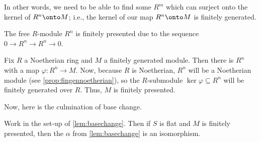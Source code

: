 In other words, we need to be able to find some $R^m$ which can surject onto the kernel of $R^n\onto M$; i.e., the kernel of our map $R^n\onto M$ is finitely generated.
\begin{example}
	The free $R$-module $R^n$ is finitely presented due to the sequence $0\to R^n\to R^n\to 0$.
\end{example}
\begin{example}
	Fix $R$ a Noetherian ring and $M$ a finitely generated module. Then there is $R^n$ with a map $\varphi:R^n\to M$. Now, because $R$ is Noetherian, $R^n$ will be a Noetherian module (see \autoref{prop:fingennoetherian}), so the $R$-submodule $\ker\varphi\subseteq R^n$ will be finitely generated over $R$. Thus, $M$ is finitely presented.
\end{example}
Now, here is the culmination of base change.
\begin{proposition} \label{prop:basechange}
	Work in the set-up of \autoref{lem:basechange}. Then if $S$ is flat and $M$ is finitely presented, then the $\alpha$ from \autoref{lem:basechange} is an isomorphism.
\end{proposition}
